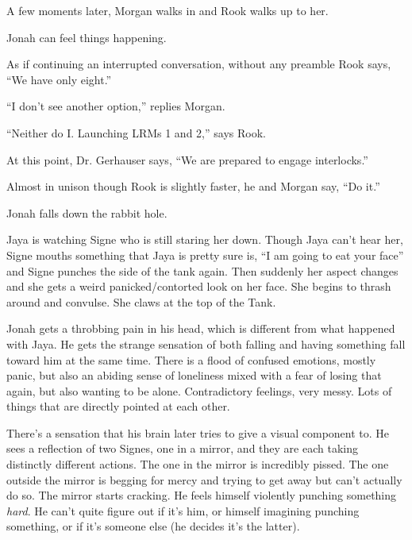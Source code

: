 A few moments later, Morgan walks in and Rook walks up to her.

Jonah can feel things happening. 

As if continuing an interrupted conversation, without any preamble Rook says, ``We have only eight.''

``I don't see another option,'' replies Morgan.

``Neither do I.  Launching LRMs 1 and 2,'' says Rook.

At this point, Dr. Gerhauser says, ``We are prepared to engage interlocks.''

Almost in unison though Rook is slightly faster, he and Morgan say, ``Do it.''



Jonah falls down the rabbit hole.





Jaya is watching Signe who is still staring her down.  Though Jaya can't hear her, Signe mouths something that Jaya is pretty sure is, ``I am going to eat your face'' and Signe punches the side of the tank again.  Then suddenly her aspect changes and she gets a weird panicked/contorted look on her face.  She begins to thrash around and convulse.  She claws at the top of the Tank.





Jonah gets a throbbing pain in his head, which is different from what happened with Jaya.  He gets the strange sensation of both falling and having something fall toward him at the same time.  There is a flood of confused emotions, mostly panic, but also an abiding sense of loneliness mixed with a fear of losing that again, but also wanting to be alone.  Contradictory feelings, very messy.  Lots of things that are directly pointed at each other.  



There's a sensation that his brain later tries to give a visual component to.  He sees a reflection of two Signes, one in a mirror, and they are each taking distinctly different actions.  The one in the mirror is incredibly pissed.  The one outside the mirror is begging for mercy and trying to get away but can't actually do so.  The mirror starts cracking.  He feels himself violently punching something \textit{hard}. He can't quite figure out if it's him, or himself imagining punching something, or if it's someone else (he decides it's the latter).



